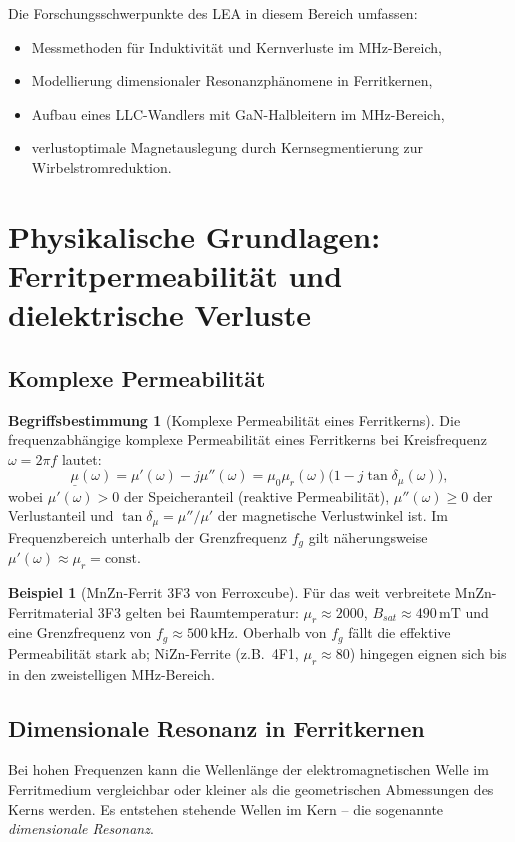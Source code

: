 ﻿\documentclass[a4paper,12pt,openany,oneside]{book}
\newcommand{\abschnitt}[1]{\section{#1}}
\newcommand{\unterabschnitt}[1]{\subsection{#1}}
\theoremstyle{definition}
\newtheorem{definition}{Begriffsbestimmung}[chapter]
\newtheorem{beispiel}{Beispiel}[chapter]
\begin{document}
Die Forschungsschwerpunkte des LEA in diesem Bereich umfassen:
\begin{itemize}
  \item Messmethoden f\"ur Induktivit\"at und Kernverluste im MHz-Bereich,
  \item Modellierung dimensionaler Resonanzph\"anomene in Ferritkernen,
  \item Aufbau eines LLC-Wandlers mit GaN-Halbleitern im MHz-Bereich,
  \item verlustoptimale Magnetauslegung durch Kernsegmentierung zur Wirbel\-strom\-reduktion.
\end{itemize}

\abschnitt{Physikalische Grundlagen: Ferritpermeabilit\"at und dielektrische Verluste}

\unterabschnitt{Komplexe Permeabilit\"at}

\begin{definition}[Komplexe Permeabilit\"at eines Ferritkerns]
  Die frequenzabh\"angige komplexe Permeabilit\"at eines Ferritkerns bei Kreisfrequenz
  $\omega = 2\pi f$ lautet:
  \[
    \underline{\mu}(\omega) = \mu'(\omega) - j\mu''(\omega)
    = \mu_0 \mu_r(\omega)\bigl(1 - j\tan\delta_\mu(\omega)\bigr),
  \]
  wobei $\mu'(\omega) > 0$ der Speicheranteil (reaktive Permeabilit\"at), $\mu''(\omega) \geq 0$
  der Verlustanteil und $\tan\delta_\mu = \mu''/\mu'$ der magnetische Verlustwinkel ist.
  Im Frequenzbereich unterhalb der Grenzfrequenz $f_g$ gilt n\"aherungsweise
  $\mu'(\omega) \approx \mu_r = \mathrm{const}$.
\end{definition}

\begin{beispiel}[MnZn-Ferrit 3F3 von Ferroxcube]
  F\"ur das weit verbreitete MnZn-Ferritmat\-erial 3F3 gelten bei Raumtemperatur:
  $\mu_r \approx 2000$, $B_{sat} \approx 490\,\mathrm{mT}$ und eine Grenzfrequenz von
  $f_g \approx 500\,\mathrm{kHz}$. Oberhalb von $f_g$ f\"allt die effektive Permeabilit\"at
  stark ab; NiZn-Ferrite (z.B.\ 4F1, $\mu_r \approx 80$) hingegen eignen sich bis in
  den zweistelligen MHz-Bereich.
\end{beispiel}

\unterabschnitt{Dimensionale Resonanz in Ferritkernen}

Bei hohen Frequenzen kann die Wellenl\"ange der elektromagnetischen Welle im Ferritmedium
vergleichbar oder kleiner als die geometrischen Abmessungen des Kerns werden. Es entstehen
stehende Wellen im Kern -- die sogenannte \emph{dimensionale Resonanz}.
\end{document}

